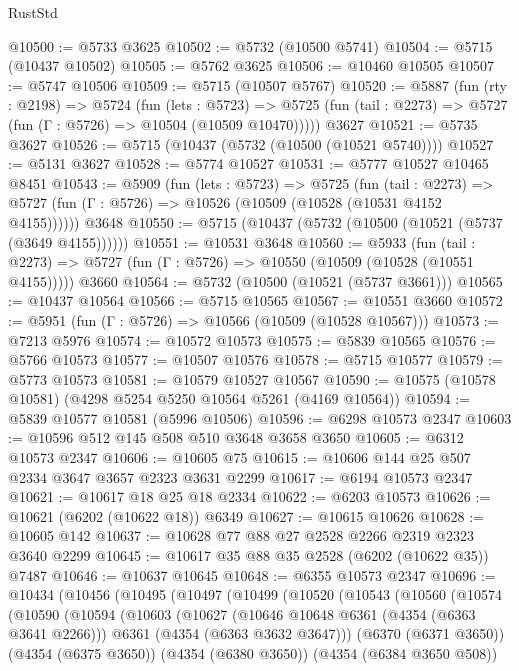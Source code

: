 \begin{lexlean}{RustStd}
\begin{coremodule}
@10500 := @5733 @3625
@10502 := @5732 (@10500 @5741)
@10504 := @5715 (@10437 @10502)
@10505 := @5762 @3625
@10506 := @10460 @10505
@10507 := @5747 @10506
@10509 := @5715 (@10507 @5767)
@10520 := @5887
    (fun (rty : @2198) =>
    @5724
      (fun (lets : @5723) =>
      @5725 (fun (tail : @2273) => @5727 (fun (Γ : @5726) => @10504 (@10509 @10470)))))
    @3627
@10521 := @5735 @3627
@10526 := @5715 (@10437 (@5732 (@10500 (@10521 @5740))))
@10527 := @5131 @3627
@10528 := @5774 @10527
@10531 := @5777 @10527 @10465 @8451
@10543 := @5909
    (fun (lets : @5723) =>
    @5725
      (fun (tail : @2273) =>
      @5727 (fun (Γ : @5726) => @10526 (@10509 (@10528 (@10531 @4152 @4155))))))
    @3648
@10550 := @5715 (@10437 (@5732 (@10500 (@10521 (@5737 (@3649 @4155))))))
@10551 := @10531 @3648
@10560 := @5933
    (fun (tail : @2273) => @5727 (fun (Γ : @5726) => @10550 (@10509 (@10528 (@10551 @4155)))))
    @3660
@10564 := @5732 (@10500 (@10521 (@5737 @3661)))
@10565 := @10437 @10564
@10566 := @5715 @10565
@10567 := @10551 @3660
@10572 := @5951 (fun (Γ : @5726) => @10566 (@10509 (@10528 @10567)))
@10573 := @7213 @5976
@10574 := @10572 @10573
@10575 := @5839 @10565
@10576 := @5766 @10573
@10577 := @10507 @10576
@10578 := @5715 @10577
@10579 := @5773 @10573
@10581 := @10579 @10527 @10567
@10590 := @10575 (@10578 @10581) (@4298 @5254 @5250 @10564 @5261 (@4169 @10564))
@10594 := @5839 @10577 @10581 (@5996 @10506)
@10596 := @6298 @10573 @2347
@10603 := @10596 @512 @145 @508 @510 @3648 @3658 @3650
@10605 := @6312 @10573 @2347
@10606 := @10605 @75
@10615 := @10606 @144 @25 @507 @2334 @3647 @3657 @2323 @3631 @2299
@10617 := @6194 @10573 @2347
@10621 := @10617 @18 @25 @18 @2334
@10622 := @6203 @10573
@10626 := @10621 (@6202 (@10622 @18)) @6349
@10627 := @10615 @10626
@10628 := @10605 @142
@10637 := @10628 @77 @88 @27 @2528 @2266 @2319 @2323 @3640 @2299
@10645 := @10617 @35 @88 @35 @2528 (@6202 (@10622 @35)) @7487
@10646 := @10637 @10645
@10648 := @6355 @10573 @2347
@10696 := @10434
    (@10456
      (@10495
        (@10497
          (@10499
            (@10520
              (@10543
                (@10560
                  (@10574
                    (@10590
                      (@10594
                        (@10603
                          (@10627
                            (@10646 @10648 @6361 (@4354 (@6363 @3641 @2266)))
                            @6361
                            (@4354 (@6363 @3632 @3647)))
                          (@6370 (@6371 @3650))
                          (@4354 (@6375 @3650))
                          (@4354 (@6380 @3650))
                          (@4354 (@6384 @3650 @508))

\end{coremodule}
\end{lexlean}
